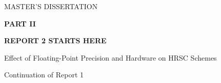 \documentclass[a4paper,12pt]{article}
\newcommand{\ReportOnePdf}{inputs/report1.pdf}
\newcommand{\ReportTwoPdf}{inputs/report2.pdf}
\begin{document}


\clearpage
{}
{}
\thispagestyle{empty}
\begin{center}
  \vspace*{0.24\textheight}
  {\Large MASTER'S DISSERTATION\par}
  \vspace{1.5cm}
  {\fontsize{30}{36}\selectfont\bfseries PART II\par}
  \vspace{0.8cm}
  {\LARGE\bfseries REPORT 2 STARTS HERE\par}
  \vspace{1.5cm}
  {\large Effect of Floating-Point Precision and Hardware on HRSC Schemes\par}
  \vfill
  {\large Continuation of Report 1\par}
\end{center}

\clearpage

\end{document}
